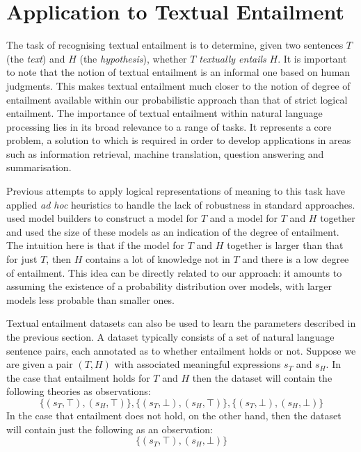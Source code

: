 \documentclass[letterpaper]{article}
\newcommand{\citet}[1]{\newcite{#1}}
\begin{document}


\section{Application to Textual Entailment}

The task of recognising textual entailment \cite{Dagan:05} is to
determine, given two sentences $T$ (the \emph{text}) and $H$ (the
\emph{hypothesis}), whether $T$ {\em textually entails\/} $H$. It is important to note that the notion of
textual entailment is an informal one based on human judgments. This makes textual entailment much closer to the notion of degree of entailment available within our probabilistic approach than that of strict logical entailment.  The importance of textual entailment within natural language processing lies in its broad relevance to a range of tasks. It represents a core problem, a solution to which is required in order to develop applications in areas such as
information retrieval, machine translation, question answering and
summarisation.

Previous attempts to apply logical representations of meaning to this
task have applied {\em ad hoc\/} heuristics to handle the lack of robustness in
standard approaches. \citet{Bos:06} used model builders to construct a
model for $T$ and a model for $T$ and $H$ together and used the size
of these models as an indication of the degree of entailment. The
intuition here is that if the model for $T$ and $H$ together is larger
than that for just $T$, then $H$ contains a lot of knowledge not in
$T$ and there is a low degree of entailment.  This idea can be
directly related to our approach: it amounts to assuming the existence of a probability
distribution over models,
with larger models less probable than smaller ones.

Textual entailment datasets can also be used to learn the parameters
described in the previous section. A dataset typically consists of a
set of natural language sentence pairs, each annotated as to whether
entailment holds or not. Suppose we are given a pair $(T,H)$ with associated meaningful expressions $s_T$ and $s_H$. In the case that entailment holds for $T$ and $H$ then the dataset will contain the following theories as observations:
\[
\{(s_T,\top),(s_H,\top)\}, \{(s_T,\bot),(s_H,\top)\},\{(s_T,\bot),(s_H,\bot)\}
\]
In the case that entailment does not hold, on the other hand, then the dataset will contain just the following as an observation:
\[
\{(s_T,\top),(s_H,\bot)\}
\]
\end{document}
